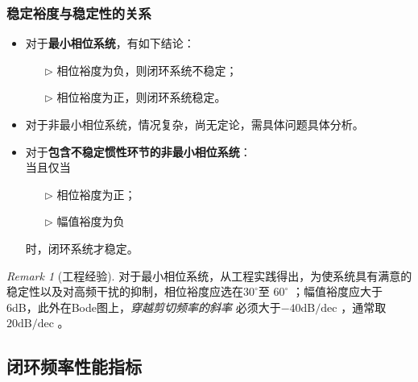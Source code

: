 \documentclass[14pt,a4paper]{article}
\theoremstyle{plain}
\theoremstyle{definition}
\theoremstyle{remark}
\newtheorem{rmk}{Remark}[section]
\theoremstyle{plain}
\theoremstyle{plain}
\theoremstyle{plain}
\theoremstyle{definition}
\theoremstyle{remark}
\numberwithin{equation}{section}
\begin{document}
			\subsubsection{稳定裕度与稳定性的关系}%
			\label{ssub:稳定裕度与稳定性的关系}
		
				\begin{itemize}
					\item 对于\textbf{最小相位系统}，有如下结论：
						\begin{itemize}
							\item[$\triangleright$] 相位裕度为负，则闭环系统不稳定；
							\item[$\triangleright$] 相位裕度为正，则闭环系统稳定。
						\end{itemize} 
						
					\item 对于非最小相位系统，情况复杂，尚无定论，需具体问题具体分析。 
						
					\item 对于\textbf{包含不稳定惯性环节的非最小相位系统}：\\
						当且仅当
						\begin{itemize}
							\item[$\triangleright$] 相位裕度为正；
							\item[$\triangleright$] 幅值裕度为负	
						\end{itemize}
						时，闭环系统才稳定。
				\end{itemize}  


				\begin{rmk}[工程经验]  
					对于最小相位系统，从工程实践得出，为使系统具有满意的稳定性以及对高频干扰的抑制，相位裕度应选在$30^\circ$至 $60^\circ$ ；幅值裕度应大于6dB，此外在Bode图上，\emph{穿越剪切频率的斜率} 必须大于$-40 \text{dB/dec}$ ，通常取$20 \text{dB/dec}$ 。
				\end{rmk}


		\subsection{闭环频率性能指标}%
		\label{sub:闭环频率性能指标}
		
\end{document}
